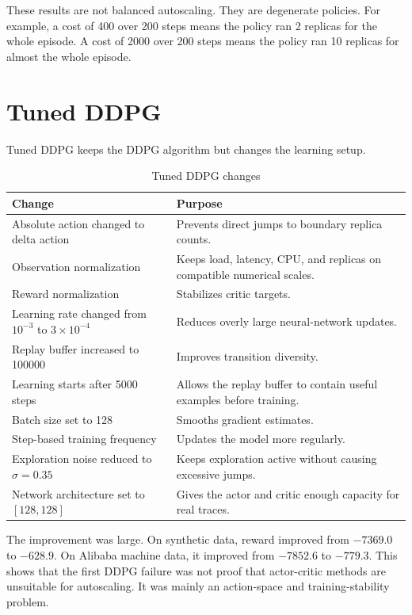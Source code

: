\documentclass{rapportINPTCLOUD}
\begin{document}
These results are not balanced autoscaling. They are degenerate policies. For example, a cost of 400 over 200 steps means the policy ran 2 replicas for the whole episode. A cost of 2000 over 200 steps means the policy ran 10 replicas for almost the whole episode.

\section{Tuned DDPG}

Tuned DDPG keeps the DDPG algorithm but changes the learning setup.

\begin{table}[H]
\centering
\begin{tabularx}{\textwidth}{lY}
\toprule
\textbf{Change} & \textbf{Purpose} \\
\midrule
Absolute action changed to delta action & Prevents direct jumps to boundary replica counts. \\
Observation normalization & Keeps load, latency, CPU, and replicas on compatible numerical scales. \\
Reward normalization & Stabilizes critic targets. \\
Learning rate changed from $10^{-3}$ to $3 \times 10^{-4}$ & Reduces overly large neural-network updates. \\
Replay buffer increased to 100000 & Improves transition diversity. \\
Learning starts after 5000 steps & Allows the replay buffer to contain useful examples before training. \\
Batch size set to 128 & Smooths gradient estimates. \\
Step-based training frequency & Updates the model more regularly. \\
Exploration noise reduced to $\sigma=0.35$ & Keeps exploration active without causing excessive jumps. \\
Network architecture set to $[128,128]$ & Gives the actor and critic enough capacity for real traces. \\
\bottomrule
\end{tabularx}
\caption{Tuned DDPG changes}
\label{tab:tuned-ddpg}
\end{table}

The improvement was large. On synthetic data, reward improved from $-7369.0$ to $-628.9$. On Alibaba machine data, it improved from $-7852.6$ to $-779.3$. This shows that the first DDPG failure was not proof that actor-critic methods are unsuitable for autoscaling. It was mainly an action-space and training-stability problem.
\end{document}

